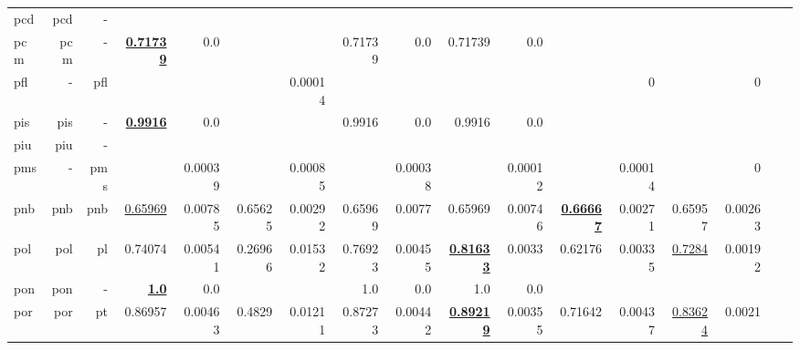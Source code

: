 \documentclass[11pt]{article}
\begin{document}
\begin{table*}[h]
{\begin{tabular}{lrrrrrrrrrrrrrrrr}
pcd         & pcd         & -         &          &          &          &          &          &          &          &          &          &          &          &          \\
pcm         & pcm         & -         & \textbf{\underline{0.71739}}         & 0.0         &          &          & 0.71739         & 0.0         & 0.71739         & 0.0         &          &          &          &          \\
pfl         & -         & pfl         &          &          &          & 0.00014         &          &          &          &          &          & 0         &          & 0         \\
pis         & pis         & -         & \textbf{\underline{0.9916}}         & 0.0         &          &          & 0.9916         & 0.0         & 0.9916         & 0.0         &          &          &          &          \\
piu         & piu         & -         &          &          &          &          &          &          &          &          &          &          &          &          \\
pms         & -         & pms         &          & 0.00039         &          & 0.00085         &          & 0.00038         &          & 0.00012         &          & 0.00014         &          & 0         \\
pnb         & pnb         & pnb         & \underline{0.65969}         & 0.00785         & 0.65625         & 0.00292         & 0.65969         & 0.0077         & 0.65969         & 0.00746         & \textbf{\underline{0.66667}}         & 0.00271         & 0.65957         & 0.00263         \\
pol         & pol         & pl         & 0.74074         & 0.00541         & 0.26966         & 0.01532         & 0.76923         & 0.00455         & \textbf{\underline{0.81633}}         & 0.0033         & 0.62176         & 0.00335         & \underline{0.7284}         & 0.00192         \\
pon         & pon         & -         & \textbf{\underline{1.0}}         & 0.0         &          &          & 1.0         & 0.0         & 1.0         & 0.0         &          &          &          &          \\
por         & por         & pt         & 0.86957         & 0.00463         & 0.4829         & 0.01211         & 0.87273         & 0.00442         & \textbf{\underline{0.89219}}         & 0.00355         & 0.71642         & 0.00437         & \underline{0.83624}         & 0.0021         \\

\end{tabular}}
\end{table*}
\end{document}
